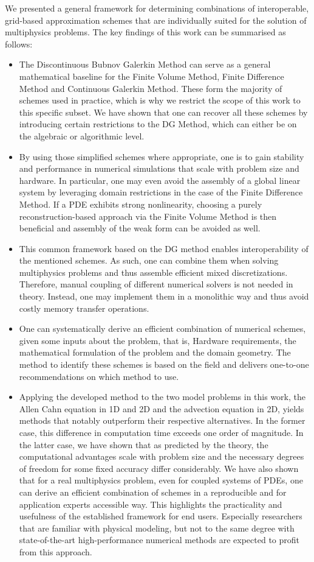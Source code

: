 \documentclass[asi,article,submit,moreauthors]{Definitions/mdpi}
\begin{document}
We presented a general framework for determining combinations of interoperable, grid-based approximation schemes that are individually suited for the solution of multiphysics problems.
The key findings of this work can be summarised as follows:
\begin{itemize}
    \item The Discontinuous Bubnov Galerkin Method can serve as a general mathematical baseline for the Finite Volume Method, Finite Difference Method and Continuous Galerkin Method.
    These form the majority of schemes used in practice, which is why we restrict the scope of this work to this specific subset.
    We have shown that one can recover all these schemes by introducing certain restrictions to the DG Method, which can either be on the algebraic or algorithmic level.
    \item By using those simplified schemes where appropriate, one is to gain stability and performance in numerical simulations that scale with problem size and hardware.
    In particular, one may even avoid the assembly of a global linear system by leveraging domain restrictions in the case of the Finite Difference Method.
    If a PDE exhibits strong nonlinearity, choosing a purely reconstruction-based approach via the Finite Volume Method is then beneficial and assembly of the weak form can be avoided as well.
    \item This common framework based on the DG method enables interoperability of the mentioned schemes.
    As such, one can combine them when solving multiphysics problems and thus assemble efficient mixed discretizations.
    Therefore, manual coupling of different numerical solvers is not needed in theory.
    Instead, one may implement them in a monolithic way and thus avoid costly memory transfer operations.
    \item One can systematically derive an efficient combination of numerical schemes, given some inputs about the problem, that is, Hardware requirements, the mathematical formulation of the problem and the domain geometry. The method to identify these schemes is based on the field and delivers one-to-one recommendations on which method to use.
    \item Applying the developed method to the two model problems in this work, the Allen Cahn equation in 1D and 2D and the advection equation in 2D, yields methods that notably outperform their respective alternatives. In the former case, this difference in computation time exceeds one order of magnitude.
    In the latter case, we have shown that as predicted by the theory, the computational advantages scale with problem size and the necessary degrees of freedom for some fixed accuracy differ considerably.
    We have also shown that for a real multiphysics problem, even for coupled systems of PDEs, one can derive an efficient combination of schemes in a reproducible and for application experts accessible way.
    This highlights the practicality and usefulness of the established framework for end users.
    Especially researchers that are familiar with physical modeling, but not to the same degree with state-of-the-art high-performance numerical methods are expected to profit from this approach.
\end{itemize}
\end{document}
